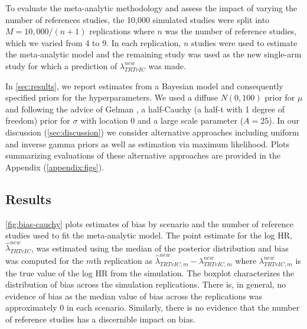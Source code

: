 \documentclass[11pt,final,fleqn]{article}\usepackage[]{graphicx}\usepackage[]{color}
\begin{document}
To evaluate the meta-analytic methodology and assess the impact of varying the number of references studies, the 10,000 simulated studies were split into $M=10,000/(n+1)$ replications where $n$ was the number of reference studies, which we varied from 4 to 9. In each replication, $n$ studies were used to estimate the meta-analytic model and the remaining study was used as the new single-arm study for which a prediction of $\lambda^{new}_{\textit{TRT}vIC}$ was made. 

In \autoref{sec:results}, we report estimates from a Bayesian model and consequently specified priors for the hyperparameters. We used a diffuse $N(0, 100)$ prior for $\mu$ and following the advice of Gelman \cite{gelman2006prior}, a half-Cauchy (a half-t with 1 degree of freedom) prior for $\sigma$ with location $0$ and a large scale parameter ($A = 25$). In our discussion (\autoref{sec:discussion}) we consider alternative approaches including uniform and inverse gamma priors as well as estimation via maximum likelihood. Plots summarizing evaluations of these alternative approaches are provided in the Appendix (\autoref{appendix:figs}).

\subsection{Results} \label{sec:results}
\autoref{fig:bias-cauchy} plots estimates of bias by scenario and the number of reference studies used to fit the meta-analytic model. The point estimate for the log HR, $\hat{\lambda}^{new}_{\textit{TRT}vIC}$, was estimated using the median of the posterior distribution and bias was computed for the $m$th replication as $\hat{\lambda}^{new}_{\textit{TRT}vIC,m} - \lambda^{new}_{\textit{TRT}vIC,m}$ where $\lambda^{new}_{\textit{TRT}vIC,m}$ is the true value of the log HR from the simulation. The boxplot characterizes the distribution of bias across the simulation replications. There is, in general, no evidence of bias as the median value of bias across the replications was approximately 0 in each scenario. Similarly, there is no evidence that the number of reference studies has a discernible impact on bias. 
\end{document}
